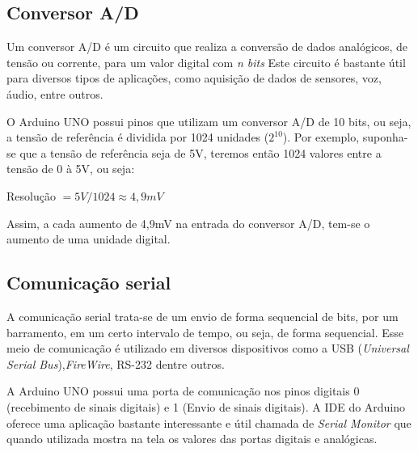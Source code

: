 \subsection{Conversor A/D}

Um conversor A/D é um circuito que realiza a conversão de dados analógicos, de tensão ou corrente, para um valor digital com \textit{n bits}  Este circuito é bastante útil para diversos tipos de aplicações, como aquisição de dados de sensores, voz, áudio, entre outros.

O Arduino UNO possui pinos que utilizam um conversor A/D de 10 bits, ou seja, a tensão de referência é dividida por 1024 unidades ($2^{10}$). Por exemplo, suponha-se que a tensão de referência seja de 5V, teremos então 1024 valores entre a tensão de 0 à 5V, ou seja:

\begin{center}
Resolução $= 5V/1024 \approx 4,9mV$ 
\end{center}


Assim, a cada aumento de 4,9mV  na entrada do conversor A/D, tem-se o aumento de uma unidade digital.
\subsection{Comunicação serial}

A comunicação serial trata-se de um envio de forma sequencial de bits, por um barramento, em um certo intervalo de tempo, ou seja, de forma sequencial. Esse meio de comunicação é utilizado em diversos dispositivos como a USB (\textit{Universal Serial Bus}),\textit{FireWire}, RS-232 dentre outros. 

A Arduino UNO possui uma porta de comunicação nos pinos digitais 0 (recebimento de sinais digitais) e 1 (Envio de sinais digitais). A IDE do Arduino oferece uma aplicação bastante interessante e útil chamada de \textit{Serial Monitor} que quando utilizada mostra na tela os valores  das portas digitais e analógicas.

